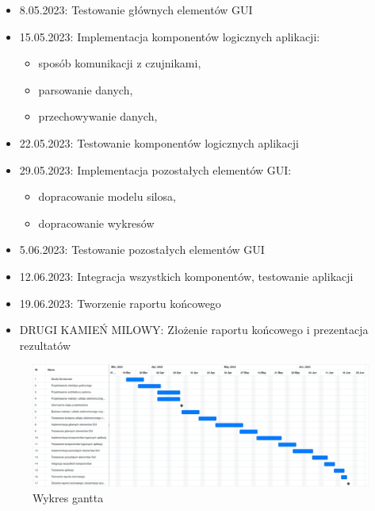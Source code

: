 \begin{itemize}
    \item 
        8.05.2023: Testowanie głównych elementów GUI
    \item 
        15.05.2023: Implementacja komponentów logicznych aplikacji:
        \begin{itemize}
            \item sposób komunikacji z czujnikami,
            \item parsowanie danych,
            \item przechowywanie danych,
        \end{itemize}
    \item 
        22.05.2023: Testowanie komponentów logicznych aplikacji
    \item 
        29.05.2023: Implementacja pozostałych elementów GUI:
        \begin{itemize}
            \item dopracowanie modelu silosa,
            \item dopracowanie wykresów
        \end{itemize}
    \item 
        5.06.2023: Testowanie pozostałych elementów GUI
    \item 
        12.06.2023: Integracja wszystkich komponentów, testowanie aplikacji
    \item 
        19.06.2023: Tworzenie raportu końcowego
    \item DRUGI KAMIEŃ MILOWY:  Złożenie raportu końcowego i prezentacja rezultatów
\end{itemize}

\begin{figure}[H]
    \centering
    \includegraphics[width = \textheight, angle = 270]{obrazy/wsd_gantt.png}
    \caption{Wykres gantta}
    \label{fig: gantt}
\end{figure}
